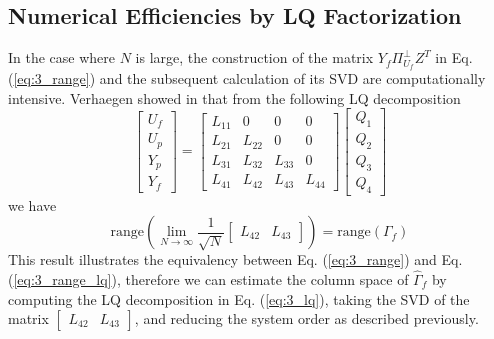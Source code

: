 \subsection{Numerical Efficiencies by LQ Factorization}
In the case where $N$ is large, the construction of the matrix $Y_f\Pi_{U_f}^\perp Z^T$ in Eq. (\ref{eq:3_range}) and the subsequent calculation of its SVD are computationally intensive. Verhaegen showed in \cite{verhaegen1994identification} that from the following LQ decomposition
\begin{equation}\label{eq:3_lq}
\begin{bmatrix}U_f\\ U_p\\ Y_p\\ Y_f\end{bmatrix} = 
\begin{bmatrix}
	L_{11} & 0 & 0 & 0\\
	L_{21} & L_{22} & 0 & 0\\
	L_{31} & L_{32} & L_{33} & 0\\
	L_{41} & L_{42} & L_{43} & L_{44}
\end{bmatrix}
\begin{bmatrix}Q_1\\ Q_2\\ Q_3\\ Q_4\end{bmatrix}
\end{equation}
we have
\begin{equation}\label{eq:3_range_lq}
\mbox{range}\left(\lim_{N\rightarrow\infty} \frac{1}{\sqrt{N}} \begin{bmatrix}L_{42} & L_{43}\end{bmatrix}\right) = \mbox{range}\left(\Gamma_f\right)
\end{equation}
This result illustrates the equivalency between Eq. (\ref{eq:3_range}) and Eq. (\ref{eq:3_range_lq}), therefore we can estimate the column space of $\hat{\Gamma}_f$ by computing the LQ decomposition in Eq. (\ref{eq:3_lq}), taking the SVD of the matrix $\begin{bmatrix}L_{42} & L_{43}\end{bmatrix}$, and reducing the system order as described previously.









